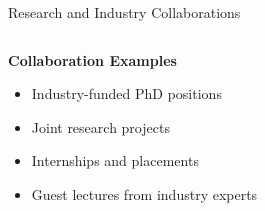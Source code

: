 \documentclass[10pt]{beamer}
\begin{document}
\begin{frame}[fragile]{Research and Industry Collaborations}
\begin{columns}[T]
\begin{column}{0.5\textwidth}
            \vspace{0.5cm}
            
            \textbf{Collaboration Examples}
            \begin{itemize}
                \item Industry-funded PhD positions
                \item Joint research projects
                \item Internships and placements
                \item Guest lectures from industry experts
            \end{itemize}
        \end{column}
    \end{columns}
\end{frame}
\end{document}
